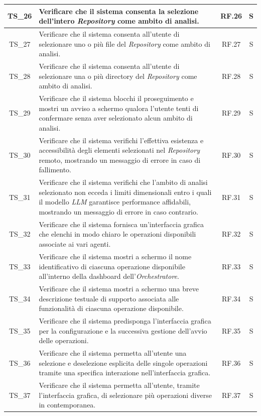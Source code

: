 \documentclass[12pt, a4paper]{article}
\newlength{\LargColVal} %
\begin{document}
\begin{xltabular}{\textwidth}{|c|X|C{\LargColVal}|C{\LargColVal}|}
    TS\_26 & Verificare che il sistema consenta la selezione dell'intero \textit{Repository} come ambito di analisi. & RF.26 & S \\ \hline
    TS\_27 & Verificare che il sistema consenta all'utente di selezionare uno o più file del \textit{Repository} come ambito di analisi. & RF.27 & S \\ \hline
    TS\_28 & Verificare che il sistema consenta all'utente di selezionare una o più directory del \textit{Repository} come ambito di analisi. & RF.28 & S \\ \hline
    TS\_29 & Verificare che il sistema blocchi il proseguimento e mostri un avviso a schermo qualora l'utente tenti di confermare senza aver selezionato alcun ambito di analisi. & RF.29 & S \\ \hline
    TS\_30 & Verificare che il sistema verifichi l'effettiva esistenza e accessibilità degli elementi selezionati nel \textit{Repository} remoto, mostrando un messaggio di errore in caso di fallimento. & RF.30 & S \\ \hline
    TS\_31 & Verificare che il sistema verifichi che l'ambito di analisi selezionato non ecceda i limiti dimensionali entro i quali il modello \textit{LLM} garantisce performance affidabili, mostrando un messaggio di errore in caso contrario. & RF.31 & S \\ \hline
    TS\_32 & Verificare che il sistema fornisca un'interfaccia grafica che elenchi in modo chiaro le operazioni disponibili associate ai vari agenti. & RF.32 & S \\ \hline
    TS\_33 & Verificare che il sistema mostri a schermo il nome identificativo di ciascuna operazione disponibile all'interno della dashboard dell'\textit{Orchestratore}. & RF.33 & S \\ \hline
    TS\_34 & Verificare che il sistema mostri a schermo una breve descrizione testuale di supporto associata alle funzionalità di ciascuna operazione disponibile. & RF.34 & S \\ \hline
    TS\_35 & Verificare che il sistema predisponga l'interfaccia grafica per la configurazione e la successiva gestione dell'avvio delle operazioni. & RF.35 & S \\ \hline
    TS\_36 & Verificare che il sistema permetta all'utente una selezione e deselezione esplicita delle singole operazioni tramite una specifica interazione nell'interfaccia grafica. & RF.36 & S \\ \hline
    TS\_37 & Verificare che il sistema permetta all'utente, tramite l'interfaccia grafica, di selezionare più operazioni diverse in contemporanea. & RF.37 & S \\ \hline

\end{xltabular}
\end{document}
